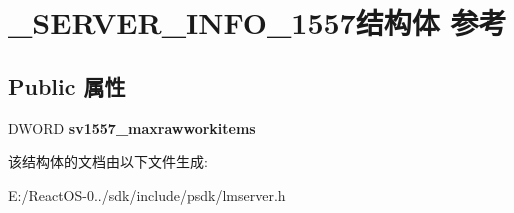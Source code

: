 \hypertarget{struct___s_e_r_v_e_r___i_n_f_o__1557}{}\section{\+\_\+\+S\+E\+R\+V\+E\+R\+\_\+\+I\+N\+F\+O\+\_\+1557结构体 参考}
\label{struct___s_e_r_v_e_r___i_n_f_o__1557}
\subsection*{Public 属性}
\begin{DoxyCompactItemize}
\item 
\mbox{\label{struct___s_e_r_v_e_r___i_n_f_o__1557_a309c843cdde429b24a9df7a73d8118b8}} 
D\+W\+O\+RD {\bfseries sv1557\+\_\+maxrawworkitems}
\end{DoxyCompactItemize}


该结构体的文档由以下文件生成\+:\begin{DoxyCompactItemize}
\item 
E\+:/\+React\+O\+S-\/0../sdk/include/psdk/lmserver.\+h\end{DoxyCompactItemize}
